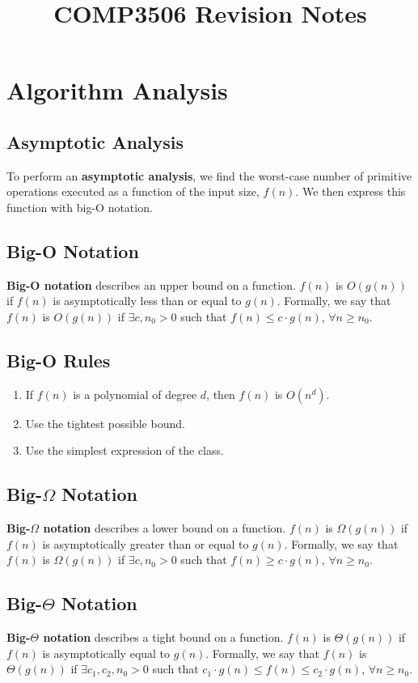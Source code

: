 \documentclass[12pt]{extarticle}
\title{COMP3506 Revision Notes}
\date{}
\newcommand{\N}{\newline\newline}
\begin{document}
	\maketitle
	\section{Algorithm Analysis}
	\subsection{Asymptotic Analysis}
	To perform an \textbf{asymptotic analysis}, we find the worst-case number of primitive operations executed as a function of the input size, $f(n)$.\N
	We then express this function with big-O notation.
	\subsection{Big-O Notation}
	\textbf{Big-O notation} describes an upper bound on a function. $f(n)$ is $O(g(n))$ if $f(n)$ is asymptotically less than or equal to $g(n)$.\N
	Formally, we say that $f(n)$ is $O(g(n))$ if $\exists c,n_{0} > 0$ such that $f(n) \leq c\cdot g(n)$, $\forall n \geq n_{0}$.
	\subsection{Big-O Rules}
	\begin{enumerate}
		\item
		If $f(n)$ is a polynomial of degree $d$, then $f(n)$ is $O(n^d)$.
		\item
		Use the tightest possible bound.
		\item
		Use the simplest expression of the class.
	\end{enumerate}
	\subsection{Big-$\Omega$ Notation}
	\textbf{Big-$\Omega$ notation} describes a lower bound on a function. $f(n)$ is $\Omega(g(n))$ if $f(n)$ is asymptotically greater than or equal to $g(n)$.\N
	Formally, we say that $f(n)$ is $\Omega(g(n))$ if $\exists c,n_{0} > 0$ such that $f(n) \geq c\cdot g(n)$, $\forall n \geq n_{0}$.
	\subsection{Big-$\Theta$ Notation}
	\textbf{Big-$\Theta$ notation} describes a tight bound on a function. $f(n)$ is $\Theta(g(n))$ if $f(n)$ is asymptotically equal to $g(n)$.\N
	Formally, we say that $f(n)$ is $\Theta(g(n))$ if $\exists c_{1},c_{2},n_{0} > 0$ such that $c_{1}\cdot g(n) \leq f(n) \leq c_{2}\cdot g(n)$, $\forall n \geq n_{0}$.\N
\end{document}
